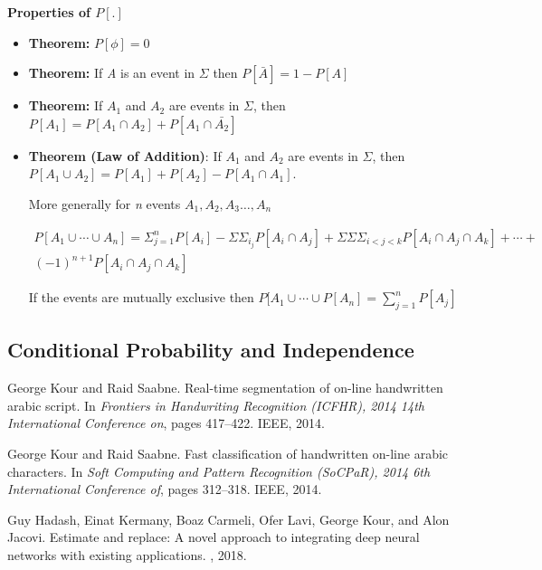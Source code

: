 \documentclass[12pt]{article}
\begin{document}
\textbf{Properties of $P[.]$}
\begin{itemize}
	\item \textbf{Theorem: }$P[\phi]=0$
	\item \textbf{Theorem: }If \textit{A} is an event in $\Sigma$ then $P[\bar{{A}}]=1-P[A]$
	\item \textbf{Theorem: }If $A_{1}$ and $A_{2}$ are events in $\Sigma$, then $P[A_{1}]=P[A_{1}\cap A_{2}] + P[A_{1}\cap \bar {A_{2}}]$
	\item \textbf{Theorem (Law of Addition)}: If $A_{1}$ and $A_{2}$ are events in $\Sigma$, then $P[A_{1} \cup A_{2}]=P[A_{1}]+P[A_{2}]-P[A_{1}\cap A_{1}]$.
	
	More generally for \textit{n} events $A_{1},A_{2},A_{3}\dots,A_{n}$
	
	\begin{equation}
	\begin{split}
	P[A_{1} \cup \dotsm \cup A_{n}] =\Sigma_{j=1}^{n}P[A_{i}]-\Sigma\Sigma_{i_j}P[A_{i}\cap A_{j}]+ \Sigma\Sigma\Sigma_{i<j<k}P[A_{i}\cap A_{j}\cap A_{k}] +\dotsm +\\
	(-1)^{n+1}P[A_{i}\cap A_{j}\cap A_{k}]
	\end{split}
	\end{equation}
	
	If the events are mutually exclusive then $P[A_{1} \cup \dotsm \cup P[A_{n} ]=\sum_{j=1}^{n}P[A_{j}]$
\end{itemize}

\subsection{Conditional Probability and Independence}






  


\begin{thebibliography}{1}

George Kour and Raid Saabne.
\newblock Real-time segmentation of on-line handwritten arabic script.
\newblock In {\em Frontiers in Handwriting Recognition (ICFHR), 2014 14th
  International Conference on}, pages 417--422. IEEE, 2014.

George Kour and Raid Saabne.
\newblock Fast classification of handwritten on-line arabic characters.
\newblock In {\em Soft Computing and Pattern Recognition (SoCPaR), 2014 6th
  International Conference of}, pages 312--318. IEEE, 2014.

Guy Hadash, Einat Kermany, Boaz Carmeli, Ofer Lavi, George Kour, and Alon
  Jacovi.
\newblock Estimate and replace: A novel approach to integrating deep neural
  networks with existing applications.
, 2018.

\end{thebibliography}
\end{document}
